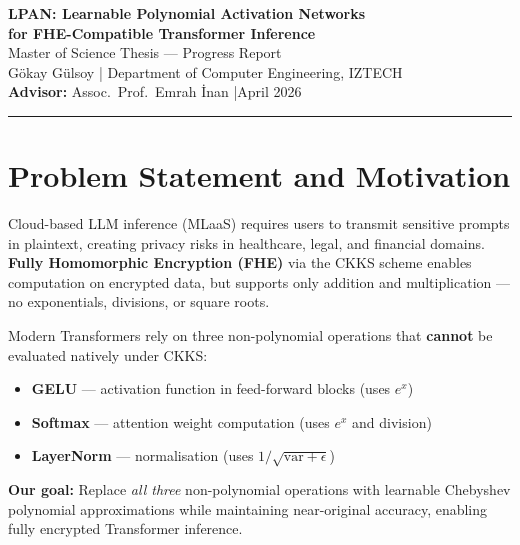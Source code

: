 \documentclass[12pt, a4paper]{article}
\begin{document}

\begin{center}
  {\LARGE\bfseries\color{iztechblue}
    LPAN: Learnable Polynomial Activation Networks\\[4pt]
    for FHE-Compatible Transformer Inference}\\[1.2em]
  {\large Master of Science Thesis --- Progress Report}\\[0.4em]
  {\normalsize
    G\"{o}kay G\"{u}lsoy \quad|\quad
    Department of Computer Engineering, IZTECH\\[0.3em]
    \textbf{Advisor:} Assoc.\ Prof.\ Emrah \.{I}nan \quad|\quad April 2026}
\end{center}

\vspace{0.5em}
\noindent\rule{\textwidth}{1.5pt}
\vspace{0.3em}

\section{Problem Statement and Motivation}

Cloud-based LLM inference (MLaaS) requires users to transmit sensitive prompts in plaintext, creating privacy risks in healthcare, legal, and financial domains. \textbf{Fully Homomorphic Encryption (FHE)} via the CKKS scheme enables computation on encrypted data, but supports only addition and multiplication --- no exponentials, divisions, or square roots.

Modern Transformers rely on three non-polynomial operations that \textbf{cannot} be evaluated natively under CKKS:
\begin{itemize}[leftmargin=2em]
  \item \textbf{GELU} --- activation function in feed-forward blocks (uses $e^x$)
  \item \textbf{Softmax} --- attention weight computation (uses $e^x$ and division)
  \item \textbf{LayerNorm} --- normalisation (uses $1/\sqrt{\mathrm{var}+\epsilon}$)
\end{itemize}

\textbf{Our goal:} Replace \emph{all three} non-polynomial operations with learnable Chebyshev polynomial approximations while maintaining near-original accuracy, enabling fully encrypted Transformer inference.
\end{document}
